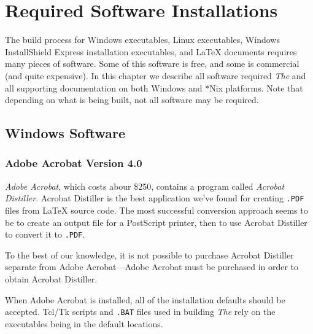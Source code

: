 %
\chapter{Required Software Installations}
\label{crsi0}

The build process for Windows executables, Linux executables, 
Windows InstallShield Express installation executables, 
and \LaTeX{} documents requires many pieces of software.
Some of this software is free, and some is commercial
(and quite expensive).  In this chapter we describe 
all software required \emph{The \tsname{}} and all supporting
documentation on both Windows and *Nix platforms.  Note that
depending on what is being built, not all software may
be required.


\section{Windows Software}
\label{crsi0:swso0}


\subsection{Adobe Acrobat Version 4.0}
\label{crsi0:swso0:saaf0}

\emph{Adobe Acrobat}, which costs abour \$250, contains a program
called \emph{Acrobat Distiller}.
Acrobat Distiller 
is the best application
we've found for 
creating \texttt{.PDF} files from
\LaTeX{} source code.  The most successful
conversion approach seems to be 
to create an output file for a PostScript printer,
then to use Acrobat Distiller to convert it to 
\texttt{.PDF}.

To the best of our knowledge, it is not possible to purchase
Acrobat Distiller separate from Adobe Acrobat---Adobe
Acrobat must be purchased in order to obtain Acrobat Distiller.

When Adobe Acrobat is installed, all of the installation defaults
should be accepted.  Tcl/Tk 
scripts and  \texttt{.BAT}
files used in building \emph{The \tsname{}} rely on the 
executables being in the default locations.


